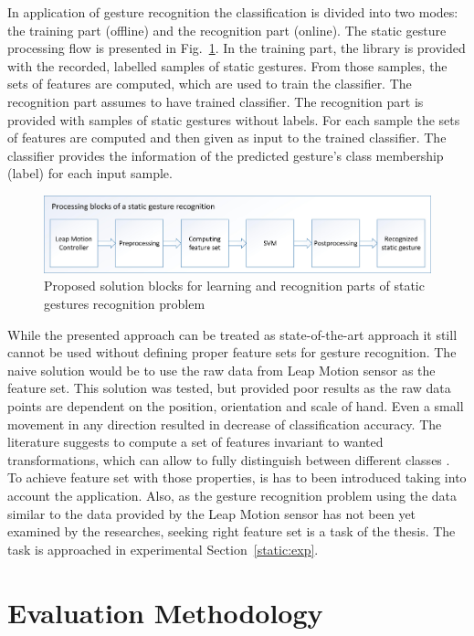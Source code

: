 In application of gesture recognition the classification is divided into two modes: the training part (offline) and the recognition part (online). 
The static gesture processing flow is presented in Fig.~\ref{staticsol}.
In the training part, the library is provided with the recorded, labelled samples of static gestures. 
From those samples, the sets of features are computed, which are used to train the classifier.
The recognition part assumes to have trained classifier. 
The recognition part is provided with samples of static gestures without labels. 
For each sample the sets of features are computed and then given as input to the trained classifier.
The classifier provides the information of the predicted gesture's class membership (label) for each input sample.

\begin{figure}[htb]
\centering
 \includegraphics[width=1\columnwidth]{figures/StaticGestures2.jpg}
 \caption[]{Proposed solution blocks for learning and recognition parts of static gestures recognition problem}
 \label{staticsol}
\end{figure}

While the presented approach can be treated as state-of-the-art approach it still cannot be used without defining proper feature sets for gesture recognition.
The naive solution would be to use the raw data from Leap Motion sensor as the feature set.
This solution was tested, but provided poor results as the raw data points are dependent on the position, orientation and scale of hand. 
Even a small movement in any direction resulted in decrease of classification accuracy.
The literature suggests to compute a set of features invariant to wanted transformations, which can allow to fully distinguish between different classes \cite{BishopML,libSVM}.
To achieve feature set with those properties, is has to been introduced taking into account the application.
Also, as the gesture recognition problem using the data similar to the data provided by the Leap Motion sensor has not been yet examined by the researches, seeking right feature set is a task of the thesis.
The task is approached in experimental Section~\ref{static:exp}.

\section{Evaluation Methodology}

